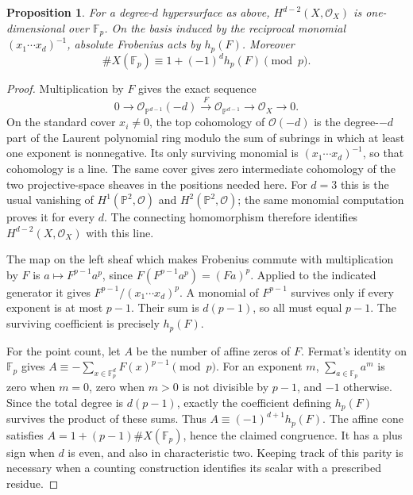 \documentclass[11pt]{article}
\newcommand{\F}{\mathbb F}
\newcommand{\PP}{\mathbb P}
\newtheorem{proposition}[theorem]{Proposition}
\theoremstyle{definition}
\begin{document}
\begin{proposition}\label{prop:scalar}
For a degree-$d$ hypersurface as above, $H^{d-2}(X,\mathcal O_X)$ is one-dimensional over $\F_p$. On the basis induced by the reciprocal monomial $(x_1\cdots x_d)^{-1}$, absolute Frobenius acts by $h_p(F)$. Moreover
\[
 \#X(\F_p)\equiv1+(-1)^d h_p(F)\pmod p.
\]
\end{proposition}
\begin{proof}
Multiplication by $F$ gives the exact sequence
\[
 0\longrightarrow\mathcal O_{\PP^{d-1}}(-d)
 \xrightarrow{\ F\ }\mathcal O_{\PP^{d-1}}
 \longrightarrow\mathcal O_X\longrightarrow0.
\]
On the standard cover $x_i\ne0$, the top cohomology of $\mathcal O(-d)$ is the degree-$-d$ part of the Laurent polynomial ring modulo the sum of subrings in which at least one exponent is nonnegative. Its only surviving monomial is $(x_1\cdots x_d)^{-1}$, so that cohomology is a line. The same cover gives zero intermediate cohomology of the two projective-space sheaves in the positions needed here. For $d=3$ this is the usual vanishing of $H^1(\PP^2,\mathcal O)$ and $H^2(\PP^2,\mathcal O)$; the same monomial computation proves it for every $d$. The connecting homomorphism therefore identifies $H^{d-2}(X,\mathcal O_X)$ with this line.

The map on the left sheaf which makes Frobenius commute with multiplication by $F$ is $a\mapsto F^{p-1}a^p$, since $F(F^{p-1}a^p)=(Fa)^p$. Applied to the indicated generator it gives
$F^{p-1}/(x_1\cdots x_d)^p$. A monomial of $F^{p-1}$ survives only if every exponent is at most $p-1$. Their sum is $d(p-1)$, so all must equal $p-1$. The surviving coefficient is precisely $h_p(F)$.

For the point count, let $A$ be the number of affine zeros of $F$. Fermat's identity on $\F_p$ gives
$A\equiv-\sum_{x\in\F_p^d}F(x)^{p-1}\pmod p$.
For an exponent $m$, $\sum_{a\in\F_p}a^m$ is zero when $m=0$, zero when $m>0$ is not divisible by $p-1$, and $-1$ otherwise. Since the total degree is $d(p-1)$, exactly the coefficient defining $h_p(F)$ survives the product of these sums. Thus $A\equiv(-1)^{d+1}h_p(F)$.
The affine cone satisfies $A=1+(p-1)\#X(\F_p)$, hence the claimed congruence. It has a plus sign when $d$ is even, and also in characteristic two. Keeping track of this parity is necessary when a counting construction identifies its scalar with a prescribed residue.
\end{proof}












\end{document}
